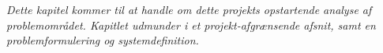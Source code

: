 \textit{Dette kapitel kommer til at handle om dette projekts opstartende analyse af problemområdet. Kapitlet udmunder i et projekt-afgrænsende afsnit, samt en problemformulering og systemdefinition.}